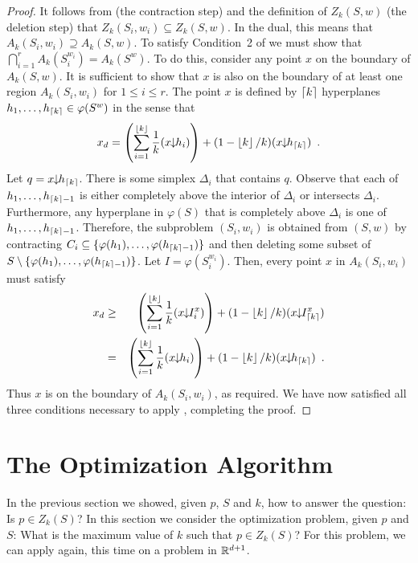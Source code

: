 \documentclass[lotsofwhite]{patmorin}
\newcommand{\drop}{\!\!\downarrow\!\!}
\newcommand{\dual}{\varphi}
\begin{document}
\begin{proof}
It follows from  (the contraction step) 
and the definition of $Z_k(S,w)$ (the deletion step)
that $Z_k(S_i,{w_i})\subseteq Z_k(S,w)$.  In the dual, this means that
$A_k(S_i,{w_i})\supseteq A_k(S,w)$.  To satisfy Condition~2 of
 we must
show that $\bigcap_{i=1}^r A_k(S_i^{w_i}) = A_k(S^w)$.  To do this,
consider any point $x$ on the boundary of $A_k(S,w)$.  It is
sufficient to show that $x$ is also on the boundary of at least one
region $A_k(S_i,{w_i})$ for $1\le i\le r$.  The point $x$ is defined
by $\left\lceil k \right\rceil$ hyperplanes $h_1,\ldots,h_{\ceil{k}}\in\dual(S^w)$ in
the sense that 
\[
   x_d=\left(\sum_{i=1}^{\floor{k}} \frac{1}{k}(x\drop h_i)\right) 
       + (1-\floor{k}/k)(x\drop h_{\ceil{k}}) \enspace .
\]
Let $q=x\drop h_{\ceil{k}}$.  There
is some simplex $\Delta_i$ that contains $q$.  Observe that
each of $h_1,\ldots,h_{\left\lceil k \right\rceil-1}$ is either completely above
the interior of $\Delta_i$ or intersects $\Delta_i$.  Furthermore, 
any hyperplane in
$\dual(S)$ that is completely above $\Delta_i$ is one of
$h_1,\ldots,h_{\left\lceil k \right\rceil-1}$.  Therefore, the subproblem $(S_i,w_i)$
is obtained from $(S,w)$ by contracting
$C_i\subseteq\{\dual(h_1),\ldots,\dual(h_{\ceil{k}-1})\}$ and then deleting 
some subset of
$S\setminus\{\dual(h_1),\ldots,\dual(h_{\ceil{k}-1})\}$.  Let
$I=\dual(S_i^{w_i})$.  Then, every point $x$ in $A_k(S_i,w_i)$ must
satisfy
\begin{eqnarray*}
  x_d & \ge & \left(\sum_{i=1}^{\floor{k}} \frac{1}{k}(x\drop I_i^x)\right) 
       + (1-\floor{k}/k)(x\drop I_{\ceil{k}}^x) \\
   & = & \left(\sum_{i=1}^{\floor{k}} \frac{1}{k}(x\drop h_i)\right) 
       + (1-\floor{k}/k)(x\drop h_{\ceil{k}}) \enspace .
\end{eqnarray*}
Thus $x$ is on the boundary of $A_k(S_i,w_i)$, as required.  We have
now satisfied all three conditions necessary to apply ,
completing the proof.
\end{proof}

\section{The Optimization Algorithm}

In the previous section we showed, given $p$, $S$ and $k$, how to
answer the question:  Is $p\in Z_k(S)$?  In this section we consider
the optimization problem, given $p$ and $S$: What is the maximum value
of $k$ such that $p\in Z_k(S)$?  For this problem, we can apply
 again, this time on a problem in $\mathbb{R}^{d+1}$.
\end{document}

